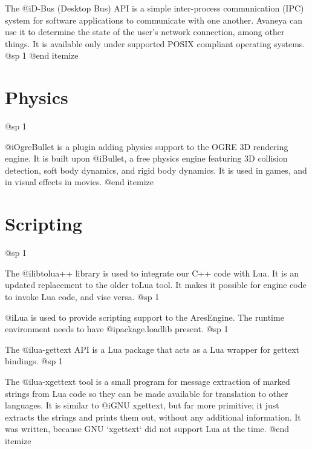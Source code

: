 \item
The @i{D-Bus} (Desktop Bus) API is a simple inter-process communication (IPC) system for software applications to communicate with one another. Avaneya can use it to determine the state of the user's network connection, among other things. It is available only under supported POSIX compliant operating systems.
@sp 1
@end itemize

\section{Physics}
@sp 1

\itemize
\item
@i{OgreBullet} is a plugin adding physics support to the OGRE 3D rendering engine. It is built upon @i{Bullet}, a free physics engine featuring 3D collision detection, soft body dynamics, and rigid body dynamics. It is used in games, and in visual effects in movies.
@end itemize


\section{Scripting}
@sp 1

\itemize

\item
The @i{libtolua++} library is used to integrate our C++ code with Lua. It is an updated replacement to the older toLua tool. It makes it possible for engine code to invoke Lua code, and vise versa.
@sp 1

\item
@i{Lua} is used to provide scripting support to the AresEngine. The runtime environment needs to have @i{package.loadlib} present.
@sp 1

\item
The @i{lua-gettext} API is a Lua package that acts as a Lua wrapper for gettext bindings.
@sp 1

\item
The @i{lua-xgettext} tool is a small program for message extraction of marked strings from Lua code so they can be made available for translation to other languages. It is similar to @i{GNU xgettext}, but far more primitive; it just extracts the strings and prints them out, without any additional information. It was written, because GNU `xgettext` did not support Lua at the time.
@end itemize


